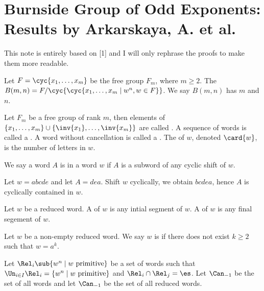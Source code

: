 \section{Burnside Group of Odd Exponents: Results by Arkarskaya, A. et al.}
\par
This note is entirely based on [1] and I will only rephrase the proofs to make them more readable.
\begin{definition}
    Let $F=\cyc{{x}_{1},\dots,{x}_{m}}$ be the free group ${F}_{m}$, where $m\ge 2$. The  $B(m,n)=F/\cyc{\cyc{{x}_{1},\dots,{x}_{m}\mid{w}^{n},w\in F}}$. We say $B(m,n)$ has  $m$ and  $n$.
\end{definition}
\begin{definition}
    Let ${F}_{m}$ be a free group of rank $m$, then elements of $\{{x}_{1},\dots,{x}_{m}\}\cup\{\inv{{x}_{1}},\dots,\inv{{x}_{m}}\}$ are called . A sequence of words is called a . A word without cancellation is called a . The  of $w$, denoted $\card{w}$, is the number of letters in $w$.
\end{definition}
\begin{definition}
    We say a word $A$ is  in a word $w$ if $A$ is a subword of any cyclic shift of $w$.
\end{definition}
\begin{example}
    Let $w=abcde$ and let $A=dea$. Shift $w$ cyclically, we obtain $bcdea$, hence $A$ is cyclically contained in $w$.
\end{example}
\begin{definition}
    Let $w$ be a reduced word. A  of $w$ is any intial segment of $w$. A  of $w$ is any final segement of $w$.
\end{definition}
\begin{definition}
    Let $w$ be a non-empty reduced word. We say $w$ is  if there does not exist $k\ge 2$ such that $w={a}^{k}$.
\end{definition}
\begin{definition}
    Let ${\Rel}_{i}\sub\{{w}^{n}\mid w\ \text{primitive}\}$ be a set of words such that ${\Un}_{i\in I}{\Rel}_{i}=\{{w}^{n}\mid w\ \text{primitive}\}$ and ${\Rel}_{i}\cap{\Rel}_{j}=\es$. Let ${\Can}_{-1}$ be the set of all words and let ${\Can}_{-1}$ be the set of all reduced words.
\end{definition}
\newpage


